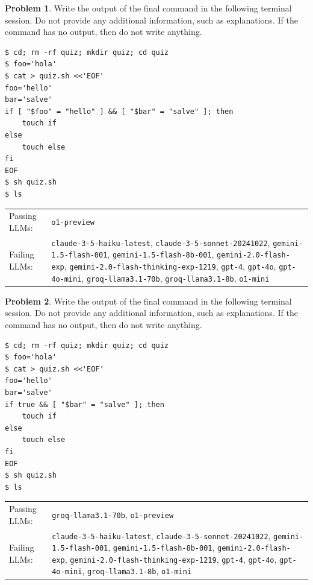 \documentclass[10pt]{article}
\theoremstyle{definition}
\newtheorem{problem}{Problem}
\begin{document}
\noindent\vspace{0.1in}\begin{minipage}{\textwidth}

\begin{problem}
Write the output of the final command in the following terminal session.
Do not provide any additional information,
such as explanations.
If the command has no output,
then do not write anything.

\end{problem}
\begin{lstlisting}
$ cd; rm -rf quiz; mkdir quiz; cd quiz
$ foo='hola'
$ cat > quiz.sh <<'EOF'
foo='hello'
bar='salve'
if [ "$foo" = "hello" ] && [ "$bar" = "salve" ]; then
    touch if
else
    touch else
fi
EOF
$ sh quiz.sh
$ ls
\end{lstlisting}


\noindent
\begin{tabular}{p{1.0in}L{5in}}
Passing LLMs: & {\lstinline$o1-preview$} \\
Failing LLMs: & {\lstinline$claude-3-5-haiku-latest$}, {\lstinline$claude-3-5-sonnet-20241022$}, {\lstinline$gemini-1.5-flash-001$}, {\lstinline$gemini-1.5-flash-8b-001$}, {\lstinline$gemini-2.0-flash-exp$}, {\lstinline$gemini-2.0-flash-thinking-exp-1219$}, {\lstinline$gpt-4$}, {\lstinline$gpt-4o$}, {\lstinline$gpt-4o-mini$}, {\lstinline$groq-llama3.1-70b$}, {\lstinline$groq-llama3.1-8b$}, {\lstinline$o1-mini$} \\
\end{tabular}

\end{minipage}
\noindent\vspace{0.1in}\begin{minipage}{\textwidth}

\begin{problem}
Write the output of the final command in the following terminal session.
Do not provide any additional information,
such as explanations.
If the command has no output,
then do not write anything.

\end{problem}
\begin{lstlisting}
$ cd; rm -rf quiz; mkdir quiz; cd quiz
$ foo='hola'
$ cat > quiz.sh <<'EOF'
foo='hello'
bar='salve'
if true && [ "$bar" = "salve" ]; then
    touch if
else
    touch else
fi
EOF
$ sh quiz.sh
$ ls
\end{lstlisting}


\noindent
\begin{tabular}{p{1.0in}L{5in}}
Passing LLMs: & {\lstinline$groq-llama3.1-70b$}, {\lstinline$o1-preview$} \\
Failing LLMs: & {\lstinline$claude-3-5-haiku-latest$}, {\lstinline$claude-3-5-sonnet-20241022$}, {\lstinline$gemini-1.5-flash-001$}, {\lstinline$gemini-1.5-flash-8b-001$}, {\lstinline$gemini-2.0-flash-exp$}, {\lstinline$gemini-2.0-flash-thinking-exp-1219$}, {\lstinline$gpt-4$}, {\lstinline$gpt-4o$}, {\lstinline$gpt-4o-mini$}, {\lstinline$groq-llama3.1-8b$}, {\lstinline$o1-mini$} \\
\end{tabular}

\end{minipage}
\end{document}
